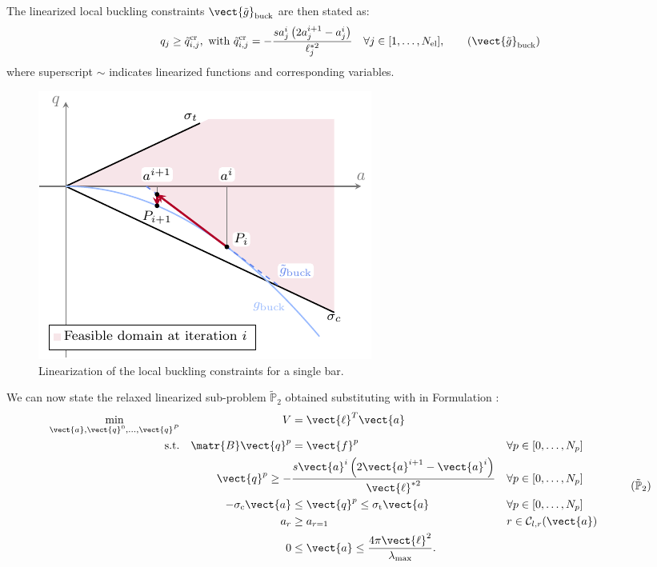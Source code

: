 The linearized local buckling constraints $\vect{\tilde{g}}_{\textrm{buck}}$ are then stated as:
\begin{equation}
    q_{j} \geq \tilde{q}^{\text{cr}}_{i,j},\text{ with } \tilde{q}^{\text{cr}}_{i,j}= - \frac{s a_{j}^i\left(2 a_{j}^{i+1} - a_{j}^i\right)}{\ell^{*2}_j} \quad \forall j \in [1,\ldots, N_{\text{el}}],
    \label{eq:04_buck_con_lin}
    \tag{$\vect{\tilde{g}}_{\textrm{buck}}$}
\end{equation}
where superscript $\sim$ indicates linearized functions and corresponding variables.

\begin{figure}
    \centering
    \includegraphics[width=0.7\linewidth]{figures/04_TTO_improvements/03_SLP/slp.pdf}
    \caption{Linearization of the local buckling constraints for a single bar.}
    \label{fig:04_SLP}
\end{figure}


We can now state the relaxed linearized sub-problem $\tilde{\mathbb{P}}_2$ obtained substituting  with  in Formulation :
\begin{equation}
    \begin{aligned}
    \min_{\vect{a}, \vect{q}^0, \dots, \vect{q}^P}   && V &= \vect{\ell}^{T}\vect{a}\\
    \textrm{s.t.}   && \matr{B}\vect{q}^p &= \vect{f}^p && \forall p \in [0,\dots,N_p]\\
    && \vect{q}^p \geq - &\frac{s \vect{a}^i\left(2 \vect{a}^{i+1} - \vect{a}^i\right)}{\vect{\ell}^{*2}} && \forall p \in [0,\dots,N_p] \\
    && -\sigma_\text{c}\vect{a} &\leq \vect{q}^p \leq \sigma_\text{t}\vect{a} && \forall p \in [0,\dots,N_p] \\
    && a_{r}&\geq a_{r=1} && r \in \mathcal{C}_{l,r}(\vect{a}) \\
    && 0 &\leq \vect{a} \leq \frac{4 \pi \vect{\ell}^2}{\lambda_{\text{max}}}. \\
    \end{aligned}
    \tag{$\tilde{\mathbb{P}}_2$}
    \label{eq:04_optim_no_constr_lp}
\end{equation}


